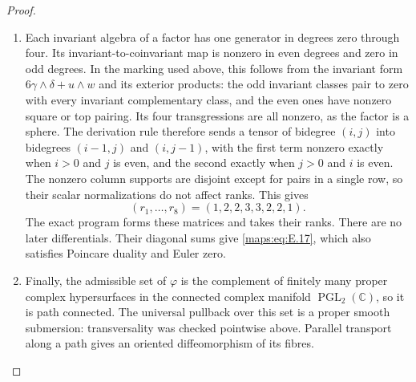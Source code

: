 \begin{proof}
\begin{enumerate}[label=\arabic*.,leftmargin=*]
\item Each invariant algebra of a factor has one generator in degrees
zero through four.  Its invariant-to-coinvariant map is nonzero
in even degrees and zero in odd degrees.  In the marking used
above, this follows from the invariant form
$6\gamma\wedge\delta+u\wedge w$ and its exterior products:
the odd invariant classes pair to zero with every invariant
complementary class, and the even ones have nonzero square or
top pairing.  Its four transgressions are all nonzero, as the
factor is a sphere.  The derivation rule therefore sends a tensor
of bidegree $(i,j)$ into bidegrees $(i-1,j)$ and $(i,j-1)$,
with the first term nonzero exactly when $i>0$ and $j$ is even,
and the second exactly when $j>0$ and $i$ is even.  The nonzero
column supports are disjoint except for pairs in a single row,
so their scalar normalizations do not affect ranks.  This gives
\[
 (r_1,\ldots,r_8)=(1,2,2,3,3,2,2,1).
\]
The exact program forms these matrices and takes their ranks.
There are no later differentials.  Their diagonal sums give
\eqref{maps:eq:E.17}, which also satisfies Poincare duality and Euler zero.

\item Finally, the admissible set of $\varphi$ is the complement of
finitely many proper complex hypersurfaces in the connected
complex manifold $\operatorname{PGL}_2(\mathbb C)$, so it is
path connected.  The universal pullback over this set is a
proper smooth submersion: transversality was checked pointwise
above.  Parallel transport along a path gives an oriented
diffeomorphism of its fibres.
\end{enumerate}
\end{proof}

